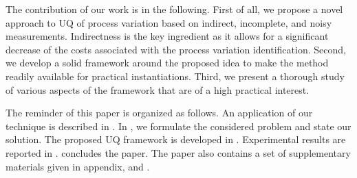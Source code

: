 The contribution of our work is in the following. First of all, we propose a novel approach to UQ of process variation based on indirect, incomplete, and noisy measurements. Indirectness is the key ingredient as it allows for a significant decrease of the costs associated with the process variation identification. Second, we develop a solid framework around the proposed idea to make the method readily available for practical instantiations. Third, we present a thorough study of various aspects of the framework that are of a high practical interest.

The reminder of this paper is organized as follows. An application of our technique is described in . In , we formulate the considered problem and state our solution. The proposed UQ framework is developed in . Experimental results are reported in .  concludes the paper. The paper also contains a set of supplementary materials given in appendix,  and .

